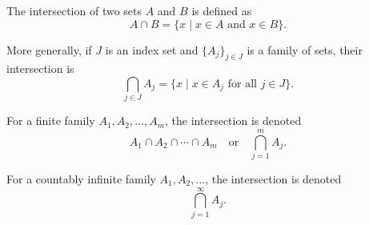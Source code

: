 The intersection of two sets $A$ and $B$ is defined as
$$A \cap B = \{x \mid x \in A \text{ and } x \in B\}.$$

More generally, if $J$ is an index set and $\{A_j\}_{j \in J}$ is a family of sets, their intersection is
$$\bigcap_{j \in J} A_j = \{x \mid x \in A_j \text{ for all } j \in J\}.$$

For a finite family $A_1, A_2, \ldots, A_m$, the intersection is denoted
$$A_1 \cap A_2 \cap \cdots \cap A_m \quad \text{or} \quad \bigcap_{j=1}^{m} A_j.$$

For a countably infinite family $A_1, A_2, \ldots$, the intersection is denoted
$$\bigcap_{j=1}^{\infty} A_j.$$
